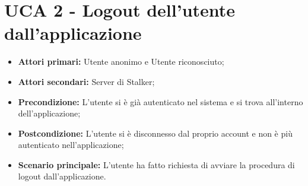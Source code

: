 \section{UCA 2 - Logout dell'utente dall'applicazione}%
\begin{itemize}
\item \textbf{Attori primari:} Utente anonimo e Utente riconosciuto;
\item \textbf{Attori secondari:} Server di Stalker;
\item \textbf{Precondizione:} L’utente si è già autenticato nel sistema e si trova all’interno dell’applicazione;
\item \textbf{Postcondizione:}  L’utente si è disconnesso dal proprio account e non è più autenticato nell’applicazione;
\item \textbf{Scenario principale:} L'utente ha fatto richiesta di avviare la procedura di logout dall'applicazione.
\end{itemize}